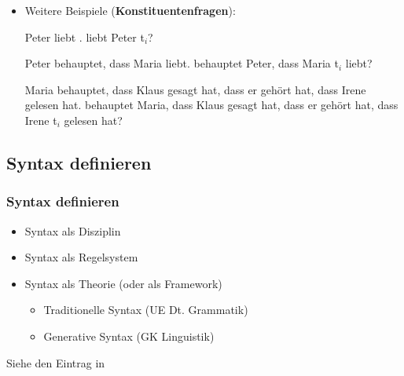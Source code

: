\begin{frame}

\begin{itemize}

	\item Weitere Beispiele (\textbf{Konstituentenfragen}):

	\eal
	\ex Peter liebt .
	\ex {} liebt Peter t$_i$?
	\zl

\pause

	\eal 
	\ex Peter behauptet, dass Maria  liebt. 
	\ex {} behauptet Peter, dass Maria t$_i$ liebt? 
	\zl

\pause

	\eal
	\zl

\pause

	\eal 
	\ex Maria behauptet, dass Klaus gesagt hat, dass er gehört hat, 	dass Irene  gelesen hat. 
	\ex {} behauptet Maria, dass Klaus gesagt hat, dass er gehört hat, dass Irene t$_i$ gelesen hat?
	\zl

\end{itemize}

\end{frame}


\subsection{Syntax definieren}


\begin{frame}
\frametitle{Syntax definieren}

\begin{itemize}
	\item Syntax als Disziplin
	\item Syntax als Regelsystem
	\item Syntax als Theorie (oder als Framework)
	\begin{itemize}
		\item Traditionelle Syntax (\ras UE Dt. Grammatik)
		\item Generative Syntax (\ras GK Linguistik)
	\end{itemize}
\end{itemize}

Siehe den Eintrag  in \citet{Glueck&Roedel16a}

\end{frame}


